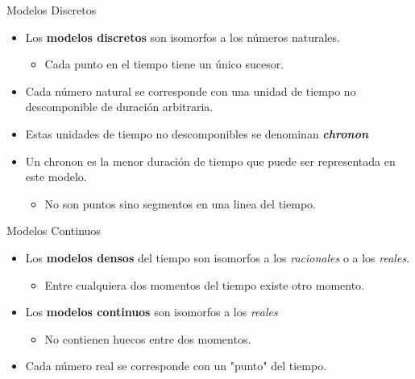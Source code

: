 \documentclass[handout, t, aspectratio=169]{beamer}
\begin{document}
\begin{frame}{Modelos Discretos}
    \begin{itemize}
        \item Los \textbf{modelos discretos} son isomorfos a los números naturales.\pause
        \begin{itemize}
            \item Cada punto en el tiempo tiene un único sucesor.
        \end{itemize}\pause
        \item Cada número natural se corresponde con una unidad de tiempo no descomponible de duración arbitraria.\pause
        \item Estas unidades de tiempo no descomponibles se denominan \textbf{\textit{chronon}}\pause
        \item Un chronon es la menor duración de tiempo que puede ser representada en este modelo.\pause
        \begin{itemize}
            \item No son puntos sino segmentos en una linea del tiempo.
        \end{itemize}
    \end{itemize}    
\end{frame}

\begin{frame}{Modelos Continuos}
    \begin{itemize}
        \item Los \textbf{modelos densos} del tiempo son isomorfos a los \textit{racionales} o a los \textit{reales}. \pause
        \begin{itemize}
            \item Entre cualquiera dos momentos del tiempo existe otro momento.
        \end{itemize}\pause
        \item Los \textbf{modelos continuos} son isomorfos a los \textit{reales} \pause
        \begin{itemize}
            \item No contienen huecos entre dos momentos.
        \end{itemize}\pause
        \item Cada número real se corresponde con un "punto" del tiempo.
    \end{itemize}    
\end{frame}
\end{document}

